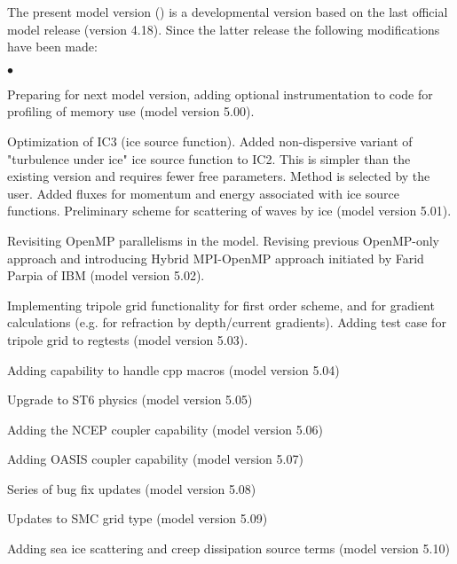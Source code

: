 \vspace{\baselineskip} 
\noindent 
The present model version (\WWver) is a developmental version based on the
last official model release (version 4.18). Since the latter release the
following modifications have been made:

\begin{list}{$\bullet$}{\rightmargin 5mm \parsep 0mm \itemsep 0mm}

\item Preparing for next model version, adding optional instrumentation to code
      for profiling of memory use (model version 5.00). 

\item Optimization of IC3 (ice source function). Added non-dispersive variant of "turbulence under ice" ice source function to IC2. This is simpler than the existing version and requires fewer free parameters. Method is selected by the user. Added fluxes for momentum and energy associated with ice source functions. Preliminary scheme for scattering of waves by ice (model version 5.01).

\item Revisiting OpenMP parallelisms in the model. Revising previous
      OpenMP-only approach and introducing Hybrid MPI-OpenMP approach
      initiated by Farid Parpia of IBM (model version 5.02).

\item Implementing tripole grid functionality for first order scheme, and for gradient calculations (e.g. for refraction by depth/current gradients). Adding test case for tripole grid to regtests (model version 5.03).

\item Adding capability to handle cpp macros (model version 5.04)

\item Upgrade to ST6 physics (model version 5.05)

\item Adding the NCEP coupler capability (model version 5.06)

\item Adding OASIS coupler capability (model version 5.07)

\item Series of bug fix updates (model version 5.08)

\item Updates to SMC grid type (model version 5.09) 

\item Adding sea ice scattering and creep dissipation source terms (model version 5.10)


\end{list}

